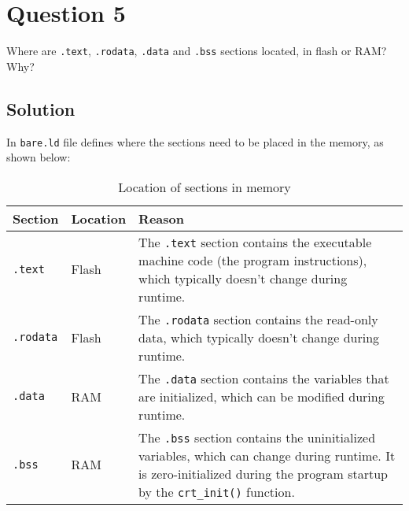 \section*{Question 5}

Where are \texttt{.text}, \texttt{.rodata}, \texttt{.data} and \texttt{.bss} sections located, in flash or RAM?
Why?

\subsection*{Solution}

In \texttt{bare.ld} file defines where the sections need to be placed in the memory, as shown below:
\begin{table}[h]
    \centering
    \begin{tabular}{p{2cm} p{2cm} p{10cm}} \toprule
        \textbf{Section}  &
        \textbf{Location} &
        \textbf{Reason}
        \\ \midrule
        \texttt{.text}    &
        Flash             &
        The \texttt{.text} section contains the executable machine code (the program instructions), which typically doesn't change during runtime.
        \\
        \texttt{.rodata}  &
        Flash             &
        The \texttt{.rodata} section contains the read-only data, which typically doesn't change during runtime.
        \\
        \texttt{.data}    &
        RAM               &
        The \texttt{.data} section contains the variables that are initialized, which can be modified during runtime.
        \\
        \texttt{.bss}     &
        RAM               &
        The \texttt{.bss} section contains the uninitialized variables, which can change during runtime.
        It is zero-initialized during the program startup by the \texttt{crt\_init\@()} function.
        \\ \bottomrule
    \end{tabular}
    \caption{Location of sections in memory}
\end{table}
